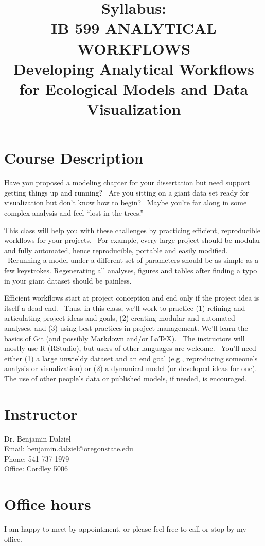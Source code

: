 \documentclass[]{article}
\title{Syllabus:\\
	IB 599 ANALYTICAL WORKFLOWS \\
	Developing Analytical Workflows for Ecological Models and Data Visualization}
\author{}
\begin{document}
\maketitle



\section*{Course Description}
	Have you proposed a modeling chapter for your dissertation but need support getting things up and running?  Are you sitting on a giant data set ready for visualization but don't know how to begin?  Maybe you're far along in some complex analysis and feel “lost in the trees.”
	
	This class will help you with these challenges by practicing efficient, reproducible workflows for your projects.  For example, every large project should be modular and fully automated, hence reproducible, portable and easily modified.  Rerunning a model under a different set of parameters should be as simple as a few keystrokes. Regenerating all analyses, figures and tables after finding a typo in your giant dataset should be painless.
	
	Efficient workflows start at project conception and end only if the project idea is itself a dead end.  Thus, in this class, we'll work to practice (1) refining and articulating project ideas and goals, (2) creating modular and automated analyses, and (3) using best-practices in project management. We'll learn the basics of Git (and possibly Markdown and/or LaTeX).  The instructors will mostly use R (RStudio), but users of other languages are welcome.  You'll need either (1) a large unwieldy dataset and an end goal (e.g., reproducing someone's analysis or visualization) or (2) a dynamical model (or developed ideas for one). The use of other people's data or published models, if needed, is encouraged.

\section*{Instructor}
	Dr. Benjamin Dalziel\\
	Email: benjamin.dalziel@oregonstate.edu\\
	Phone: 541 737 1979\\
	Office: Cordley 5006\\

\section*{Office hours}
	I am happy to meet by appointment, or please feel free to call or stop by my office. 
\end{document}
